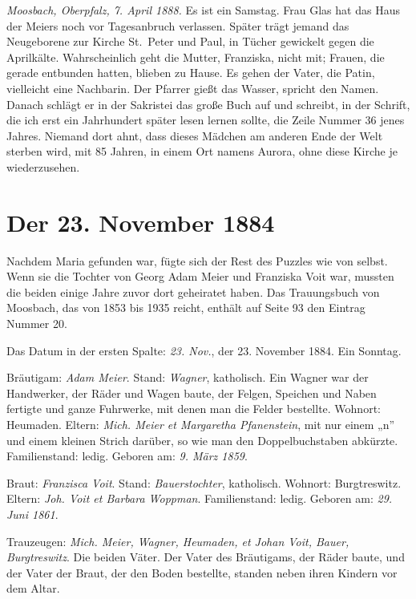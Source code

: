 \documentclass[
  ngerman,
  11pt,
  openany]{book}
\begin{document}
\emph{Moosbach, Oberpfalz, 7. April 1888.} Es ist ein Samstag. Frau Glas
hat das Haus der Meiers noch vor Tagesanbruch verlassen. Später trägt
jemand das Neugeborene zur Kirche St.~Peter und Paul, in Tücher
gewickelt gegen die Aprilkälte. Wahrscheinlich geht die Mutter,
Franziska, nicht mit; Frauen, die gerade entbunden hatten, blieben zu
Hause. Es gehen der Vater, die Patin, vielleicht eine Nachbarin. Der
Pfarrer gießt das Wasser, spricht den Namen. Danach schlägt er in der
Sakristei das große Buch auf und schreibt, in der Schrift, die ich erst
ein Jahrhundert später lesen lernen sollte, die Zeile Nummer 36 jenes
Jahres. Niemand dort ahnt, dass dieses Mädchen am anderen Ende der Welt
sterben wird, mit 85 Jahren, in einem Ort namens Aurora, ohne diese
Kirche je wiederzusehen.

\section{Der 23. November 1884}\label{der-23.-november-1884}

Nachdem Maria gefunden war, fügte sich der Rest des Puzzles wie von
selbst. Wenn sie die Tochter von Georg Adam Meier und Franziska Voit
war, mussten die beiden einige Jahre zuvor dort geheiratet haben. Das
Trauungsbuch von Moosbach, das von 1853 bis 1935 reicht, enthält auf
Seite 93 den Eintrag Nummer 20.

Das Datum in der ersten Spalte: \emph{23. Nov.}, der 23. November 1884.
Ein Sonntag.

Bräutigam: \emph{Adam Meier}. Stand: \emph{Wagner}, katholisch. Ein
Wagner war der Handwerker, der Räder und Wagen baute, der Felgen,
Speichen und Naben fertigte und ganze Fuhrwerke, mit denen man die
Felder bestellte. Wohnort: Heumaden. Eltern: \emph{Mich. Meier et
Margaretha Pfanenstein}, mit nur einem „n'' und einem kleinen Strich
darüber, so wie man den Doppelbuchstaben abkürzte. Familienstand: ledig.
Geboren am: \emph{9. März 1859}.

Braut: \emph{Franzisca Voit}. Stand: \emph{Bauerstochter}, katholisch.
Wohnort: Burgtreswitz. Eltern: \emph{Joh. Voit et Barbara Woppman}.
Familienstand: ledig. Geboren am: \emph{29. Juni 1861}.

Trauzeugen: \emph{Mich. Meier, Wagner, Heumaden, et Johan Voit, Bauer,
Burgtreswitz}. Die beiden Väter. Der Vater des Bräutigams, der Räder
baute, und der Vater der Braut, der den Boden bestellte, standen neben
ihren Kindern vor dem Altar.
\end{document}
